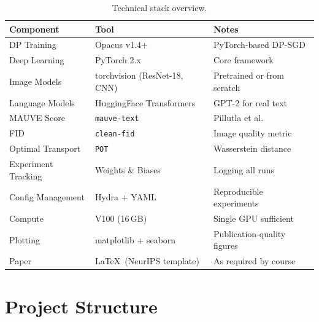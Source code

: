 \documentclass[11pt,a4paper]{article}
\begin{document}
\begin{table}[h]
\centering
\begin{tabularx}{\textwidth}{@{}lll@{}}
\toprule
\textbf{Component} & \textbf{Tool} & \textbf{Notes} \\
\midrule
DP Training & Opacus v1.4+ & PyTorch-based DP-SGD \\
Deep Learning & PyTorch 2.x & Core framework \\
Image Models & torchvision (ResNet-18, CNN) & Pretrained or from scratch \\
Language Models & HuggingFace Transformers & GPT-2 for real text \\
MAUVE Score & \texttt{mauve-text} & Pillutla et al. \\
FID & \texttt{clean-fid} & Image quality metric \\
Optimal Transport & \texttt{POT} & Wasserstein distance \\
Experiment Tracking & Weights \& Biases & Logging all runs \\
Config Management & Hydra + YAML & Reproducible experiments \\
Compute & V100 (16\,GB) & Single GPU sufficient \\
Plotting & matplotlib + seaborn & Publication-quality figures \\
Paper & \LaTeX\ (NeurIPS template) & As required by course \\
\bottomrule
\end{tabularx}
\caption{Technical stack overview.}
\end{table}

\section{Project Structure}
\end{document}
